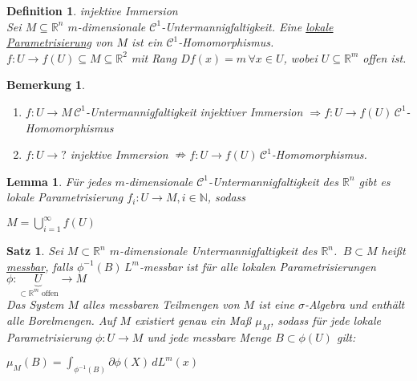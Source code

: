 \documentclass[11pt]{memoir}
\theoremstyle{changebreak}
\newtheorem{Definition}{Definition}[chapter]
\newtheorem{Bemerkung}{Bemerkung}[chapter]
\newtheorem{Lemma}{Lemma}[chapter]
\newtheorem{Satz}{Satz}[chapter]
\newcommand{\umgf}{$m$-dimensionale Untermannigfaltigkeit des $\mathbb R^n$}
\begin{document}
\begin{Definition}
\emph{injektive Immersion} \\
Sei $M \subseteq \mathbb R^n$ $m$-dimensionale $\mathscr C^1$-Untermannigfaltigkeit. Eine \underline{lokale Parametrisierung} von $M$ ist ein $\mathscr C^1$-Homomorphismus. \\
$f: U \rightarrow f(U) \subseteq M \subseteq \mathbb R^2$ mit Rang $Df(x) = m \, \forall x \in U$, wobei $U \subseteq \mathbb R^m$ offen ist.
\end{Definition}

\begin{Bemerkung}
\begin{enumerate}
	\item $f: U \rightarrow M \, \mathscr C^1$-Untermannigfaltigkeit injektiver Immersion $\Rightarrow f:U \rightarrow f(U) \, \mathscr C^1$-Homomorphismus

	\item $f: U \rightarrow ?$ injektive Immersion $\nRightarrow f: U \rightarrow f(U) \, \mathscr C^1$-Homomorphismus.
\end{enumerate}
\end{Bemerkung}

\begin{Lemma}
Für jedes $m$-dimensionale $\mathscr C^1$-Untermannigfaltigkeit des $\mathbb R^n$ gibt es lokale Parametrisierung $f_i: U \rightarrow M, i \in \mathbb N$, sodass
\begin{center}
	$M = \bigcup\limits_{i=1}^\infty f(U)$
\end{center}
\end{Lemma}


\begin{Satz}
Sei $M \subset \mathbb R^n$ \umgf. \,$ B \subset M$ heißt \underline{messbar}, falls $\phi^{-1}(B) \, L^m$-messbar ist für alle lokalen Parametrisierungen \\
 $\phi: \underbrace{U}_{\subset \mathbb R^m \text{ offen}} \rightarrow M$  \\
 Das System $M$ alles messbaren Teilmengen von $M$ ist eine $\sigma$-Algebra und enthält alle Borelmengen. Auf $M$ existiert genau ein Maß $\mu_M$, sodass für jede lokale Parametrisierung $\phi: U \rightarrow M$ und jede messbare Menge $B \subset \phi(U)$ gilt:
 \begin{center}
 	$\mu_M(B) = \int_{\phi^{-1}(B)} \partial \phi(X) \, d L^m(x)$
 \end{center}
\end{Satz}
\end{document}
